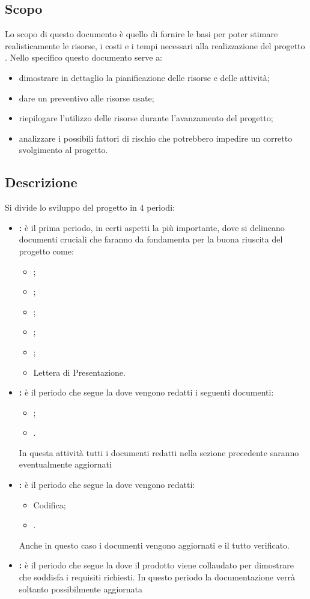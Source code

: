\documentclass[12pt,a4paper]{article}
\begin{document}
\subsection{Scopo}
Lo scopo di questo documento è quello di fornire le basi per poter stimare realisticamente le risorse, i costi e i tempi necessari alla realizzazione del progetto \textit{\prjL{}}. Nello specifico questo documento serve a:
\begin{itemize}
	\item dimostrare in dettaglio la pianificazione delle risorse e delle attività;
	\item dare un preventivo alle risorse usate;
	\item riepilogare l'utilizzo delle risorse durante l'avanzamento del progetto;
	\item analizzare i possibili fattori di rischio che potrebbero impedire un corretto svolgimento al progetto.
\end{itemize}

\subsection{Descrizione}

Si divide lo sviluppo del progetto in 4 periodi:
\begin{itemize}
	\item \textbf{\FA{}:} è il prima periodo, in certi aspetti la più importante, dove si delineano documenti cruciali che faranno da fondamenta per la buona riuscita del progetto come:
	\begin{itemize}
		\item \NdP{};
		\item \SdF{};
		\item \AdR{};
		\item \PdP{};
		\item \PdQ{};
		\item Lettera di Presentazione.
	\end{itemize}
	\item \textbf{\FPA{}:} è il periodo che segue la \RR{} dove vengono redatti i seguenti documenti:
	\begin{itemize}
		\item \ST{};
        \item \DP{}.
	\end{itemize} 
	In questa attività tutti i documenti redatti nella sezione precedente saranno eventualmente aggiornati
	\item \textbf{\FPDC{}:} è il periodo che segue la \RP{} dove vengono redatti:
	\begin{itemize}
		\item Codifica;
		\item \MU{}.
	\end{itemize}
	Anche in questo caso i documenti vengono aggiornati e il tutto verificato.
	\item \textbf{\FVV{}:} è il periodo che segue la \RQ{} dove il prodotto viene collaudato per dimostrare che soddisfa i requisiti richiesti. In questo periodo la documentazione verrà soltanto possibilmente aggiornata
\end{itemize}
\end{document}
